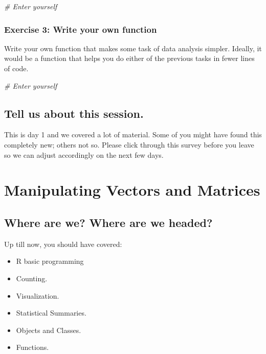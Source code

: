 \documentclass[]{book}
\newenvironment{Shaded}{\begin{snugshade}}{\end{snugshade}}
\newcommand{\CommentTok}[1]{\textcolor[rgb]{0.56,0.35,0.01}{\textit{#1}}}
\providecommand{\tightlist}{%
  \setlength{\itemsep}{0pt}\setlength{\parskip}{0pt}}
\theoremstyle{definition}
\theoremstyle{definition}
\theoremstyle{definition}
\theoremstyle{remark}
\begin{document}
\begin{Shaded}
\begin{Highlighting}[]
\CommentTok{# Enter yourself}
\end{Highlighting}
\end{Shaded}

\subsection{Exercise 3: Write your own
function}\label{exercise-3-write-your-own-function}

Write your own function that makes some task of data analysis simpler.
Ideally, it would be a function that helps you do either of the previous
tasks in fewer lines of code.

\begin{Shaded}
\begin{Highlighting}[]
\CommentTok{# Enter yourself}
\end{Highlighting}
\end{Shaded}

\section{Tell us about this session.}\label{tell-us-about-this-session.}

This is day 1 and we covered a lot of material. Some of you might have
found this completely new; others not so. Please click through this
survey before you leave so we can adjust accordingly on the next few
days.

\chapter{Manipulating Vectors and
Matrices}\label{manipulating-vectors-and-matrices}

\section{Where are we? Where are we
headed?}\label{where-are-we-where-are-we-headed-1}

Up till now, you should have covered:

\begin{itemize}
\tightlist
\item
  R basic programming
\item
  Counting.
\item
  Visualization.
\item
  Statistical Summaries.
\item
  Objects and Classes.
\item
  Functions.
\end{itemize}
\end{document}
